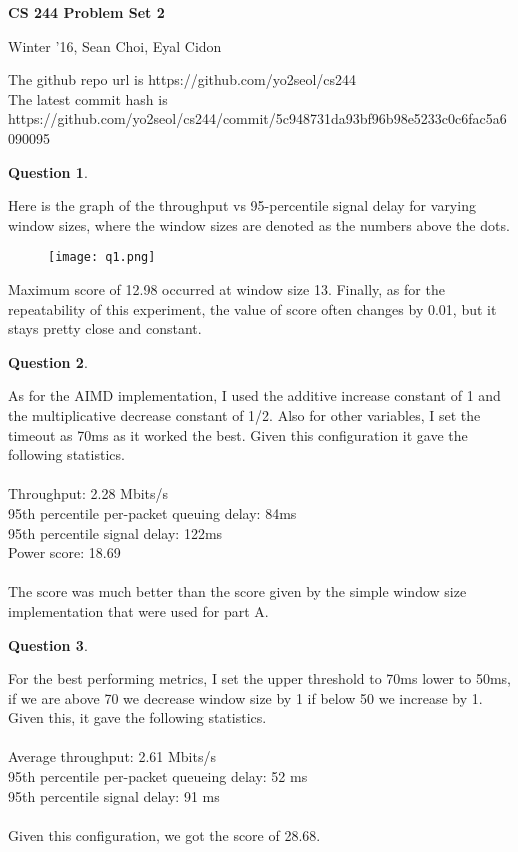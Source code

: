 \documentclass[11pt]{article}
\title{}
\author{}
\date{}
\newtheorem{pb}{Question}
\begin{document}
\begin{flushleft}
\textbf{\Large{CS 244 Problem Set 2}}
\begin{flushright} Winter '16, Sean Choi, Eyal Cidon
\end{flushright}
\end{flushleft}
The github repo url is https://github.com/yo2seol/cs244\\
The latest commit hash is
\\https://github.com/yo2seol/cs244/commit/5c948731da93bf96b98e5233c0c6fac5a6090095

\begin{pb}
\end{pb}
Here is the graph of the throughput vs 95-percentile signal delay for varying window sizes, where the window sizes are denoted as the numbers above the dots.
\begin{figure}[ht!]
\centering
\texttt{[image: q1.png]}
\end{figure}
Maximum score of 12.98 occurred at window size 13. Finally, as for the repeatability of this experiment, the value of score often changes by 0.01, but it stays pretty close and constant. 


\begin{pb}
\end{pb}

As for the AIMD implementation, I used the additive increase constant of 1 and the multiplicative decrease constant of 1/2. Also for other variables, I set the timeout as 70ms as it worked the best. Given this configuration it gave the following statistics.\\
\\
Throughput: 2.28 Mbits/s \\
95th percentile per-packet queuing delay: 84ms\\
95th percentile signal delay: 122ms\\
Power score: 18.69\\
\\
The score was much better than the score given by the simple window size implementation that were used for part A.
\begin{pb}
\end{pb}
For the best performing metrics, I set the upper threshold to 70ms lower to 50ms, if we are above 70 we decrease window size by 1 if below 50 we increase by 1. Given this, it gave the following statistics.\\
\\
Average throughput: 2.61 Mbits/s \\
95th percentile per-packet queueing delay: 52 ms\\
95th percentile signal delay: 91 ms\\
\\
Given this configuration, we got the score of 28.68.
\end{document}
